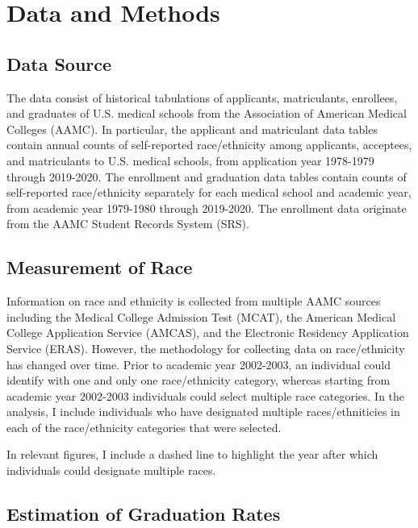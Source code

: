 \documentclass[12pt]{article}
\begin{document}

\section{Data and Methods} \label{sec:methods}

\subsection{Data Source}

The data consist of historical tabulations of applicants, matriculants, enrollees, and graduates of U.S. medical schools from the Association of American Medical Colleges (AAMC). In particular, the applicant and matriculant data tables contain annual counts of self-reported race/ethnicity among applicants, acceptees, and matriculants to U.S. medical schools, from application year 1978-1979 through 2019-2020. The enrollment and graduation data tables contain counts of self-reported race/ethnicity separately for each medical school and academic year, from academic year 1979-1980 through 2019-2020. The enrollment data originate from the AAMC Student Records System (SRS).

\subsection{Measurement of Race}

Information on race and ethnicity is collected from multiple AAMC sources including the Medical College Admission Test (MCAT), the American Medical College Application Service (AMCAS), and the Electronic Residency Application Service (ERAS). However, the methodology for collecting data on race/ethnicity has changed over time. Prior to academic year 2002-2003, an individual could identify with one and only one race/ethnicity category, whereas starting from academic year 2002-2003 individuals could select multiple race categories. In the analysis, I include individuals who have designated multiple races/ethniticies in  each of the race/ethnicity categories that were selected.

In relevant figures, I include a dashed line to highlight the year after which individuals could designate multiple races. 

\subsection{Estimation of Graduation Rates}\label{sec:gradrate}
\end{document}
